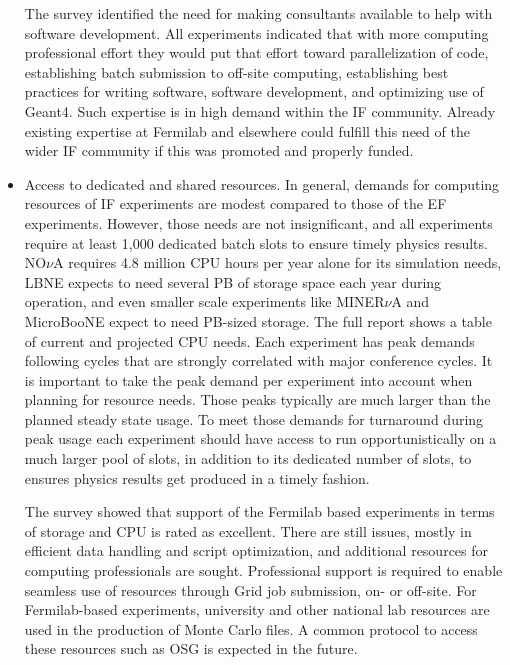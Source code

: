 \begin{itemize}
The survey identified the need for making consultants available to help with
software development. All experiments indicated that with more computing
professional effort they would put that effort toward parallelization of code,
establishing batch submission to off-site computing, establishing best
practices for writing software, software development, and  optimizing use of
Geant4. Such expertise is in high demand within the IF community. Already
existing expertise at Fermilab and elsewhere could fulfill this need of the
wider IF community if this was promoted and properly funded.

\item Access to dedicated and shared resources.  In general, demands for
computing resources of IF experiments are modest compared to those of the EF
experiments.  However, those needs are not insignificant, and all experiments
require at least 1,000 dedicated batch slots to ensure timely physics results. 
NO$\nu$A requires 4.8 million
CPU hours per year alone for its simulation needs, LBNE expects to need
several PB of storage space each year during operation, and even smaller scale
experiments like MINER$\nu$A and MicroBooNE expect to need PB-sized storage.
The full report shows a table of current and projected CPU needs. Each
experiment has peak demands following cycles that are strongly correlated with
major conference cycles.  It is important to take the peak demand per
experiment into account when planning for resource needs. Those peaks
typically are much larger than the planned steady state usage. To meet those
demands for turnaround during peak usage each experiment should have access to
run opportunistically on a much larger pool of slots, in addition to its
dedicated number of slots, to ensures physics results get produced in a timely 
fashion.

The survey showed that support of the Fermilab based experiments in terms of
storage and CPU is rated as excellent.  There are still issues, mostly in
efficient data handling and script optimization, and additional resources for
computing professionals are sought.  Professional support is required to
enable seamless use of resources through Grid job submission, on- or off-site.
For Fermilab-based experiments, university and other national lab resources
are used in the production of Monte Carlo files. A common protocol to access
these resources such as OSG is expected in the future.


\end{itemize}
